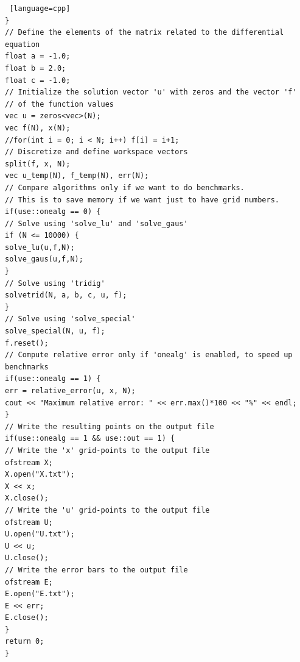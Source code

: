 \documentclass {article}
\begin{document}
\begin{lstlisting} [language=cpp]
}
// Define the elements of the matrix related to the differential equation
float a = -1.0;
float b = 2.0;
float c = -1.0;
// Initialize the solution vector 'u' with zeros and the vector 'f'
// of the function values
vec u = zeros<vec>(N);
vec f(N), x(N);
//for(int i = 0; i < N; i++) f[i] = i+1;
// Discretize and define workspace vectors
split(f, x, N);
vec u_temp(N), f_temp(N), err(N);
// Compare algorithms only if we want to do benchmarks.
// This is to save memory if we want just to have grid numbers.
if(use::onealg == 0) {
// Solve using 'solve_lu' and 'solve_gaus'
if (N <= 10000) {
solve_lu(u,f,N);
solve_gaus(u,f,N);
}
// Solve using 'tridig'
solvetrid(N, a, b, c, u, f);
}
// Solve using 'solve_special'
solve_special(N, u, f);
f.reset();
// Compute relative error only if 'onealg' is enabled, to speed up benchmarks
if(use::onealg == 1) {
err = relative_error(u, x, N);
cout << "Maximum relative error: " << err.max()*100 << "%" << endl;
}
// Write the resulting points on the output file
if(use::onealg == 1 && use::out == 1) {
// Write the 'x' grid-points to the output file
ofstream X;
X.open("X.txt");
X << x;
X.close();
// Write the 'u' grid-points to the output file
ofstream U;
U.open("U.txt");
U << u;
U.close();
// Write the error bars to the output file
ofstream E;
E.open("E.txt");
E << err;
E.close();
}
return 0;
}
\end{lstlisting}
\end{document}
